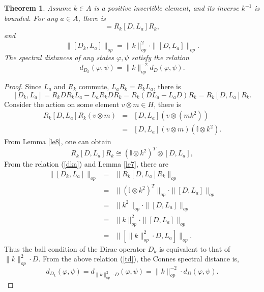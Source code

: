 \documentclass[a4paper,11pt]{article}
\newtheorem{theorem}{Theorem}
\begin{document}
\begin{theorem}
  Assume $k \in A$ is a positive invertible element, and its inverse $k^{- 1}$
  is bounded. For any $a \in A$, there is
  \begin{equation}
    [D_k, L_a] = R_k  [D, L_a] R_k,
  \end{equation}
 and
  \begin{equation}
    \|[D_k, L_a]\|_{op} = \|k\|^2_{op} \cdot \|[D, L_a]\|_{op}.
  \end{equation}
The spectral distances of any states $\varphi, \psi$ satisfy the relation
  \begin{equation}
    d_{D_k}  (\varphi, \psi) = \|k\|_{op}^{- 2} d_D  (\varphi, \psi) .
  \end{equation}
\end{theorem}

\begin{proof}
  Since $L_a$ and $R_k$ commute, $L_a R_k = R_k L_a$, there is
  \begin{equation}\label{dka}
    [D_k, L_a] = R_k DR_k L_a - L_a R_k DR_k = R_k  (DL_a - L_a D) R_k = R_k 
    [D, L_a] R_k .
  \end{equation}
 Consider the action on some element $v \otimes m\in H$, there is
  \begin{eqnarray}
    R_k  [D, L_a] R_k  (v \otimes m) & = & [D, L_a]  (v \otimes (mk^2))
    \nonumber\\
    & = & [D, L_a]  (v \otimes m)  (\mathbb{I} \otimes k^2) . 
  \end{eqnarray}
  From Lemma \ref{le8}, one can obtain
  \begin{equation}
    R_k  [D, L_a] R_k \cong (\mathbb{I} \otimes k^2)^T \otimes [D, L_a],
  \end{equation}
  From the relation (\ref{dka}) and Lemma \ref{le7}, there are
  \begin{eqnarray}
    \|[D_k, L_a]\|_{op} & = & \|R_k [D, L_a] R_k \|_{op} \nonumber\\
    & = & \|(\mathbb{I} \otimes k^2)^T \|_{op} \cdot \|[D, L_a]\|_{op}
    \nonumber\\
    & = & \|k^2 \|_{op} \cdot \|[D, L_a]\|_{op} \nonumber\\
    & = & \|k\|^2_{op} \cdot \|[D, L_a]\|_{op} \nonumber\\
    & = & \|[\|k\|^2_{op} \cdot D, L_a]\|_{op} . 
  \end{eqnarray}
  Thus the ball condition of the Dirac operator $D_k$ is equivalent to that of
  $\|k\|^2_{op} \cdot D$. From the above relation (\ref{td}), the Connes spectral distance is,
  \begin{equation}
    d_{D_k}  (\varphi, \psi) = d_{\|k\|^2_{op} \cdot D}  (\varphi, \psi) =
    \|k\|_{op}^{- 2} \cdot d_D  (\varphi, \psi) .
  \end{equation}
  
\end{proof}
\end{document}
